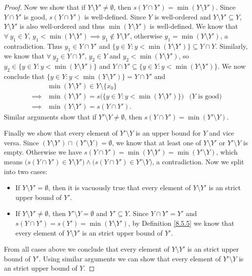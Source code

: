 \begin{proof}
    Now we show that if \(Y \setminus Y' \neq \emptyset\), then \(s(Y \cap Y') = \min(Y \setminus Y')\).
    Since \(Y \cap Y'\) is good, \(s(Y \cap Y')\) is well-defined.
    Since \(Y\) is well-ordered and \(Y \setminus Y' \subseteq Y\), \(Y \setminus Y'\) is also well-ordered and thus \(\min(Y \setminus Y')\) is well-defined.
    We know that \(\forall\ y_1 \in Y\), \(y_1 < \min(Y \setminus Y') \implies y_1 \notin Y \setminus Y'\), otherwise \(y_1 = \min(Y \setminus Y')\), a contradiction.
    Thus \(y_1 \in Y \cap Y'\) and \(\{y \in Y : y < \min(Y \setminus Y')\} \subseteq Y \cap Y\).
    Similarly, we know that \(\forall\ y_2 \in Y \cap Y'\), \(y_2 \in Y\) and \(y_2 < \min(Y \setminus Y')\), so \(y_2 \in \{y \in Y : y < \min(Y \setminus Y')\}\) and \(Y \cap Y' \subseteq \{y \in Y : y < \min(Y \setminus Y')\}\).
    We now conclude that \(\{y \in Y : y < \min(Y \setminus Y')\} = Y \cap Y'\) and
    \begin{align*}
                 & \min(Y \setminus Y') \in Y \setminus \{x_0\}                                                      \\
        \implies & \min(Y \setminus Y') = s\big(\{y \in Y : y < \min(Y \setminus Y')\}\big) & \text{(\(Y\) is good)} \\
        \implies & \min(Y \setminus Y') = s(Y \cap Y').
    \end{align*}
    Similar arguments show that if \(Y' \setminus Y \neq \emptyset\), then \(s(Y \cap Y') = \min(Y' \setminus Y)\).

    Finally we show that every element of \(Y' \setminus Y\) is an upper bound for \(Y\) and vice versa.
    Since \((Y \setminus Y') \cap (Y' \setminus Y) = \emptyset\), we know that at least one of \(Y \setminus Y'\) or \(Y' \setminus Y\) is empty.
    Otherwise we have \(s(Y \cap Y') = \min(Y \setminus Y') = \min(Y' \setminus Y)\), which means \(\big(s(Y \cap Y') \in Y \setminus Y'\big) \land \big(s(Y \cap Y') \in Y' \setminus Y\big)\), a contradiction.
    Now we split into two cases:
    \begin{itemize}
        \item If \(Y \setminus Y' = \emptyset\), then it is vacuously true that every element of \(Y \setminus Y'\) is an strict upper bound of \(Y'\).
        \item If \(Y \setminus Y' \neq \emptyset\), then \(Y' \setminus Y = \emptyset\) and \(Y' \subseteq Y\).
              Since \(Y \cap Y' = Y'\) and \(s(Y \cap Y') = s(Y') = \min(Y \setminus Y')\), by Definition \ref{8.5.5} we know that every element of \(Y \setminus Y'\) is an strict upper bound of \(Y'\).
    \end{itemize}
    From all cases above we conclude that every element of \(Y \setminus Y'\) is an strict upper bound of \(Y'\).
    Using similar arguments we can show that every element of \(Y' \setminus Y\) is an strict upper bound of \(Y\).
\end{proof}

